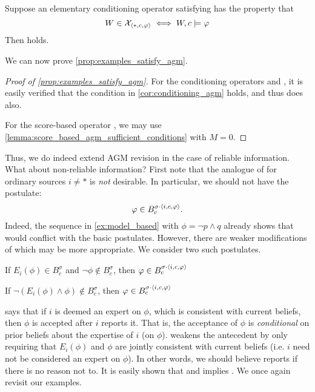 \begin{corollary}
    \label{cor:conditioning_agm}
    Suppose an elementary conditioning operator satisfying \kconj{} has the
    property that
    \[
        W \in \mathcal{X}_{\langle {\ast, c, \varphi} \rangle} \iff W, c \models \varphi
    \]
    Then \agm{} holds.
\end{corollary}

We can now prove \cref{prop:examples_satisfy_agm}.

\begin{proof}[Proof of \cref{prop:examples_satisfy_agm}]
    For the conditioning operators \varbasedcond{} and \partbasedcond{}, it is
    easily verified that the condition in \cref{cor:conditioning_agm} holds,
    and thus \agm{} does also.

    For the score-based operator \scorebasedop{}, we may use
    \cref{lemma:score_based_agm_sufficient_conditions} with $M = 0 $.
\end{proof}

Thus, we do indeed extend AGM revision in the case of reliable information.
What about non-reliable information? First note that the analogue of \agm{} for
ordinary sources $i \ne \ast$ is \emph{not} desirable. In particular, we
should not have the  postulate:
\[
    \varphi \in B^{\sigma \cdot \langle {i, c, \varphi} \rangle}_c.
\]
Indeed, the sequence in \cref{ex:model_based} with $\phi = \neg p
\land q$ already shows that  would conflict with the
basic postulates.
%
However, there are weaker modifications of  which may be
more appropriate. We consider two such postulates.

\begin{postulate}[\condsucc{}]
    If $E_i(\phi) \in B^\sigma_c$ and $\neg\phi \notin B^\sigma_c$, then $\varphi
    \in B^{\sigma \cdot \langle {i, c, \varphi} \rangle}_c$
\end{postulate}

\begin{postulate}[\strongcondsucc{}]
    If $\neg(E_i(\phi) \land \phi) \notin B^\sigma_c$, then $\varphi \in B^{\sigma
    \cdot \langle {i, c, \varphi} \rangle}_c$
\end{postulate}

\condsucc{} says that if $i$ is deemed an expert on $\phi$, which is consistent
with current beliefs, then $\phi$ is accepted after $i$ reports it. That is,
the acceptance of $\phi$ is \emph{conditional} on prior beliefs about the expertise of
$i$ (on $\phi$). \strongcondsucc{} weakens the antecedent by only requiring
that $E_i(\phi)$ and $\phi$ are jointly consistent with current beliefs (i.e.
$i$ need not be considered an expert on $\phi$). In other words, we should
believe reports if there is no reason not to. It is easily shown that
\closure{} and \strongcondsucc{} implies \condsucc{}.
%
We once again revisit our examples. 

